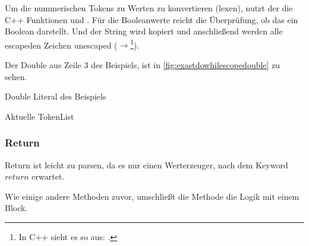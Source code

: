 {      Um die nummerischen Tokens zu Werten zu konvertieren (lexen), nutzt der  die C++ Funktionen  und . Für die Booleanwerte reicht die Überprüfung, ob das  ein Boolean darstellt. Und der String wird kopiert und anschließend werden alle escapeden Zeichen unescaped ($\rightarrow$\footnote{
        In C++ sieht es so aus: \usebox{\myMinSavBox}.
      }).

      Der Double aus Zeile 3 des Beispiels, ist in \autoref{fig:exastdowhilescopedouble} zu sehen.
      \begin{paracol}{2}
        \begin{myCodeEnv}
          \centering
          \begin{myInvBox}[width=.9\linewidth]
            
          \end{myInvBox}
          \caption{Double Literal des Beispiels}
          \label{fig:exastdowhilescopedouble}
        \end{myCodeEnv}
        \switchcolumn
        \begin{myCodeEnv}
          \centering
          \begin{myInvBox}[width=.9\linewidth]
            
          \end{myInvBox}
          \caption*{Aktuelle TokenList}
        \end{myCodeEnv}
      \end{paracol}

    \subsubsection{Return}
    \label{sssec:Return}
      Return ist leicht zu parsen, da es nur einen Werterzeuger, nach dem Keyword \myRIn$return$ erwartet.

      Wie einige andere Methoden zuvor, umschließt die  Methode die Logik mit einem  Block.

}
